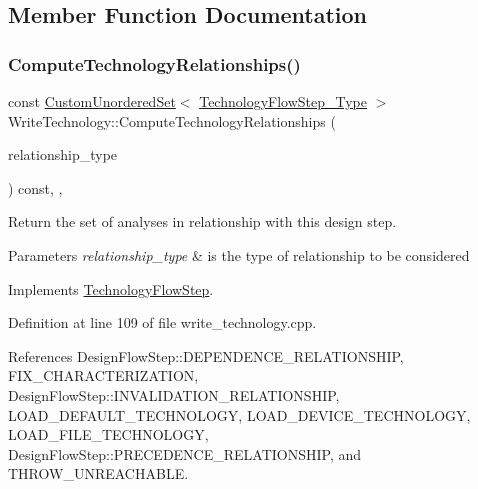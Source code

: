 \subsection{Member Function Documentation}
\mbox{\label{classWriteTechnology_a08646671bc7e22d2929cb41de50ed7bb}} 
\subsubsection{\texorpdfstring{Compute\+Technology\+Relationships()}{ComputeTechnologyRelationships()}}
{\footnotesize\ttfamily const \hyperlink{classCustomUnorderedSet}{Custom\+Unordered\+Set}$<$ \hyperlink{technology__flow__step_8hpp_a65208cfec963a7d7def292f9db428292}{Technology\+Flow\+Step\+\_\+\+Type} $>$ Write\+Technology\+::\+Compute\+Technology\+Relationships (\begin{DoxyParamCaption}\item[{const \hyperlink{classDesignFlowStep_a723a3baf19ff2ceb77bc13e099d0b1b7}{Design\+Flow\+Step\+::\+Relationship\+Type}}]{relationship\+\_\+type }\end{DoxyParamCaption}) const\hspace{0.3cm}{\ttfamily [override]}, {\ttfamily [protected]}, {\ttfamily [virtual]}}



Return the set of analyses in relationship with this design step. 


\begin{DoxyParams}{Parameters}
{\em relationship\+\_\+type} & is the type of relationship to be considered \\
\hline
\end{DoxyParams}


Implements \hyperlink{classTechnologyFlowStep_ab543169c9b0143c8ae8831d765519075}{Technology\+Flow\+Step}.



Definition at line 109 of file write\+\_\+technology.\+cpp.



References Design\+Flow\+Step\+::\+D\+E\+P\+E\+N\+D\+E\+N\+C\+E\+\_\+\+R\+E\+L\+A\+T\+I\+O\+N\+S\+H\+IP, F\+I\+X\+\_\+\+C\+H\+A\+R\+A\+C\+T\+E\+R\+I\+Z\+A\+T\+I\+ON, Design\+Flow\+Step\+::\+I\+N\+V\+A\+L\+I\+D\+A\+T\+I\+O\+N\+\_\+\+R\+E\+L\+A\+T\+I\+O\+N\+S\+H\+IP, L\+O\+A\+D\+\_\+\+D\+E\+F\+A\+U\+L\+T\+\_\+\+T\+E\+C\+H\+N\+O\+L\+O\+GY, L\+O\+A\+D\+\_\+\+D\+E\+V\+I\+C\+E\+\_\+\+T\+E\+C\+H\+N\+O\+L\+O\+GY, L\+O\+A\+D\+\_\+\+F\+I\+L\+E\+\_\+\+T\+E\+C\+H\+N\+O\+L\+O\+GY, Design\+Flow\+Step\+::\+P\+R\+E\+C\+E\+D\+E\+N\+C\+E\+\_\+\+R\+E\+L\+A\+T\+I\+O\+N\+S\+H\+IP, and T\+H\+R\+O\+W\+\_\+\+U\+N\+R\+E\+A\+C\+H\+A\+B\+LE.

